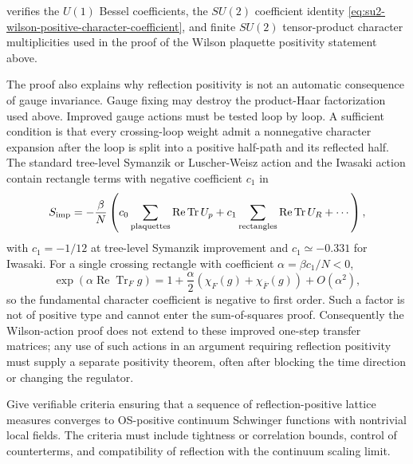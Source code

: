  verifies
the \(U(1)\) Bessel coefficients, the \(SU(2)\) coefficient identity
\eqref{eq:su2-wilson-positive-character-coefficient}, and finite
\(SU(2)\) tensor-product character multiplicities used in the proof of
the Wilson plaquette positivity statement above.

The proof also explains why reflection positivity is not an automatic
consequence of gauge invariance.  Gauge fixing may destroy the product-Haar
factorization used above.  Improved gauge actions must be tested loop by
loop.  A sufficient condition is that every crossing-loop weight admit a
nonnegative character expansion after the loop is split into a positive
half-path and its reflected half.  The standard tree-level Symanzik or
Luscher-Weisz action and the Iwasaki action contain rectangle terms with
negative coefficient \(c_1\) in
\[
  S_{\rm imp}
  =
  -\frac{\beta}{N}
  \left(
  c_0\sum_{\rm plaquettes}\operatorname{Re}\operatorname{Tr}U_p
  +c_1\sum_{\rm rectangles}\operatorname{Re}\operatorname{Tr}U_R
  +\cdots
  \right),
\]
with \(c_1=-1/12\) at tree-level Symanzik improvement and
\(c_1\simeq -0.331\) for Iwasaki.  For a single crossing rectangle with
coefficient \(\alpha=\beta c_1/N<0\),
\[
  \exp\!\left(\alpha\operatorname{Re}\operatorname{Tr}_F g\right)
  =
  1+\frac{\alpha}{2}\left(\chi_F(g)+\chi_{\overline F}(g)\right)+O(\alpha^2),
\]
so the fundamental character coefficient is negative to first order.  Such
a factor is not of positive type and cannot enter the sum-of-squares proof.
Consequently the Wilson-action proof does not extend to these improved
one-step transfer matrices; any use of such actions in an argument requiring
reflection positivity must supply a separate positivity theorem, often after
blocking the time direction or changing the regulator.

\begin{openproblem}
\label{op:reflection-positive-continuum-limits}
Give verifiable criteria ensuring that a sequence of reflection-positive
lattice measures converges to OS-positive continuum Schwinger functions with
nontrivial local fields.  The criteria must include tightness or correlation
bounds, control of counterterms, and compatibility of reflection with the
continuum scaling limit.
\end{openproblem}
